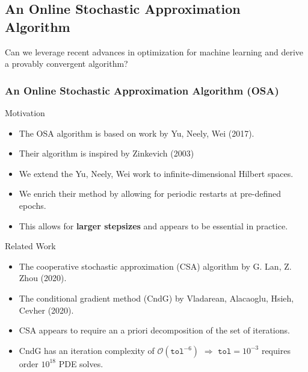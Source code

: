 \documentclass[aspectratio=169,xcolor=dvipsnames,11pt]{beamer}
\newcommand{\scrO}{\mathcal{O}}
\begin{document}
\begin{footnotesize}
\section{An Online Stochastic Approximation Algorithm}
%
\begin{frame}\thispagestyle{empty}
\vspace*{\fill}
\begin{center}
\Large 
Can we leverage recent advances in optimization for machine learning and derive a provably convergent algorithm?
\end{center}
\vspace*{\fill}
\end{frame}

\begin{frame}\frametitle{An Online Stochastic Approximation Algorithm (OSA)}
\begin{block}{Motivation}
\begin{itemize}
\item The OSA algorithm is based on work by Yu, Neely, Wei (2017).
\item Their algorithm is inspired by Zinkevich (2003)
\item We extend the Yu, Neely, Wei work to infinite-dimensional Hilbert spaces.
\item We enrich their method by allowing for periodic restarts at pre-defined epochs.
\item This allows for \textbf{larger stepsizes} and appears to be essential in practice.
\end{itemize}
\end{block}

\begin{block}{Related Work}
\begin{itemize}
\item The cooperative stochastic approximation  (CSA) algorithm by G. Lan, Z. Zhou (2020).
\item The conditional gradient method (CndG) by Vladarean, Alacaoglu, Hsieh, Cevher (2020).
\item CSA appears to require an a priori decomposition of the set of iterations.
\item CndG has an iteration complexity of $\scrO(\mathtt{tol}^{-6})$ $\Rightarrow$ $\mathtt{tol} = 10^{-3}$ requires order $10^{18}$ PDE solves.
\end{itemize}
\end{block}
\end{frame}


\end{footnotesize}
\end{document}
